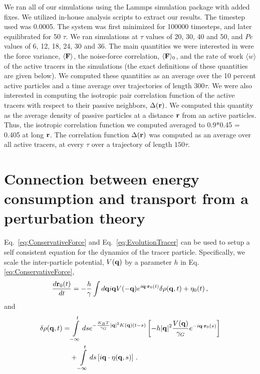 \documentclass[pre,amsmath,preprintnumbers,10pt,article,notitlepage,twocolumn]{revtex4-1}
\begin{document}
We ran all of our simulations using the Lammps simulation package with added fixes. We utilized in-house analysis scripts to extract our results. The timestep used was 0.0005. The system was first minimized for 100000 timesteps, and later equilibrated for 50 $\tau$.  We ran simulations at $\tau$ values of 20, 30, 40 and 50, and $Pe$ values of 6, 12, 18, 24, 30 and 36. The main quantities we were interested in were the force variance, $\langle {\bf F} \rangle$, the noise-force correlation, $\langle {\bf F} \rangle_0$, and the rate of work $\langle \dot{w} \rangle$ of the active tracers in the simulations (the exact definitions of these quantities are given below).  We computed these quantities as an average over the 10 percent active particles and a time average over trajectories of length $300 \tau$. 
We were also interested in computing the isotropic pair correlation function of the active tracers with respect to their passive neighbors, $\Delta({\bf r})$. We computed this quantity as the average density of passive particles at a distance ${\bf r}$ from an active particles. Thus, the isotropic correlation function we computed averaged to 0.9*0.45 = 0.405 at long ${\bf r}$. The correlation function $\Delta({\bf r})$ was computed as an average over all active tracers, at every $\tau$ over a trajectory of length $150 \tau$. 

\section{Connection between energy consumption and transport from a perturbation theory}
Eq.~\ref{eq:ConservativeForce} and Eq.~\ref{eq:EvolutionTracer} can be used to setup a self consistent equation for the dynamics of the tracer particle. Specifically, we scale the inter-particle potential, $V({\bf q})$ by a parameter $h$ in Eq. \ref{eq:ConservativeForce}, 
\begin{equation}
\dfrac{d{\bf r}_0(t)}{d t} = -\dfrac{h}{\gamma} \int  d{\bf q} i {\bf q} V(-{\bf q})e^{i{\bf q} \cdot {\bf r}_0(t)} \delta \rho({\bf q}, t) +  \eta_0(t)\,,
\label{eq:hEvolutionTracer}
\end{equation}
and 
\begin{equation}
\begin{split}
\delta\rho({\bf q},t)=
&\int\limits_{-\infty}^t ds  e^{-\frac{K_BT}{\gamma_G}|{\bf q}|^2 K({\bf q})(t-s)}\left[-h |{\bf q}|^2 \dfrac{V({\bf q})}{\gamma_G} e^{-i {\bf q}\cdot {\bf r}_0(s)}\right] \\ & +\int\limits_{-\infty}^t ds \left[ i{\bf q} \cdot \eta({\bf q},s)\right] \,.
\end{split}
\label{eq:hSolutionFourierEvolution}
\end{equation}
\end{document}
